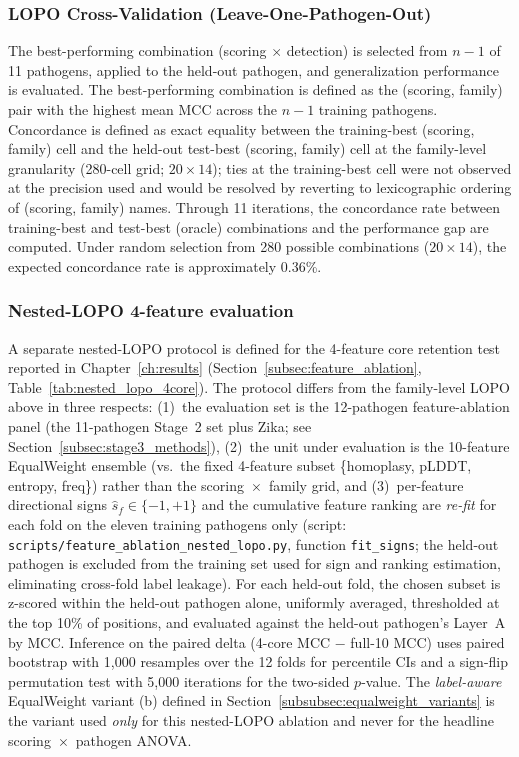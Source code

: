 \subsubsection{LOPO Cross-Validation (Leave-One-Pathogen-Out)}

The best-performing combination (scoring $\times$ detection) is selected from $n-1$ of 11 pathogens, applied to the held-out pathogen, and generalization performance is evaluated.
The best-performing combination is defined as the (scoring, family) pair with the highest mean MCC across the $n-1$ training pathogens. Concordance is defined as exact equality between the training-best (scoring, family) cell and the held-out test-best (scoring, family) cell at the family-level granularity (280-cell grid; $20 \times 14$); ties at the training-best cell were not observed at the precision used and would be resolved by reverting to lexicographic ordering of (scoring, family) names.
Through 11 iterations, the concordance rate between training-best and test-best (oracle) combinations and the performance gap are computed.
Under random selection from 280 possible combinations ($20 \times 14$), the expected concordance rate is approximately 0.36\%.

\subsubsection{Nested-LOPO 4-feature evaluation}
\label{subsubsec:nested_lopo_methods}

A separate nested-LOPO protocol is defined for the 4-feature core retention test reported in Chapter~\ref{ch:results} (Section~\ref{subsec:feature_ablation}, Table~\ref{tab:nested_lopo_4core}). The protocol differs from the family-level LOPO above in three respects: (1)~the evaluation set is the 12-pathogen feature-ablation panel (the 11-pathogen Stage~2 set plus Zika; see Section~\ref{subsec:stage3_methods}), (2)~the unit under evaluation is the 10-feature EqualWeight ensemble (vs.\ the fixed 4-feature subset \{homoplasy, pLDDT, entropy, freq\}) rather than the scoring~$\times$~family grid, and (3)~per-feature directional signs $\hat{s}_f \in \{-1, +1\}$ and the cumulative feature ranking are \emph{re-fit} for each fold on the eleven training pathogens only (script: \texttt{scripts/feature\_ablation\_nested\_lopo.py}, function \texttt{fit\_signs}; the held-out pathogen is excluded from the training set used for sign and ranking estimation, eliminating cross-fold label leakage). For each held-out fold, the chosen subset is z-scored within the held-out pathogen alone, uniformly averaged, thresholded at the top 10\% of positions, and evaluated against the held-out pathogen's Layer~A by MCC. Inference on the paired delta (4-core MCC $-$ full-10 MCC) uses paired bootstrap with 1{,}000 resamples over the 12 folds for percentile CIs and a sign-flip permutation test with 5{,}000 iterations for the two-sided $p$-value. The \emph{label-aware} EqualWeight variant (b) defined in Section~\ref{subsubsec:equalweight_variants} is the variant used \emph{only} for this nested-LOPO ablation and never for the headline scoring~$\times$~pathogen ANOVA.

